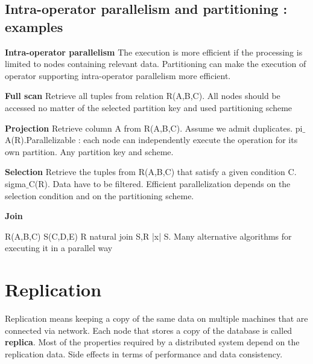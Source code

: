 \documentclass{article}
\begin{document}
\subsection{Intra-operator parallelism and partitioning : examples}

\textbf{Intra-operator parallelism }
The execution is more efficient if the processing is limited to nodes containing relevant data.
Partitioning can make the execution of operator supporting intra-operator parallelism more efficient. 

\vspace{3mm}
\textbf{Full scan}
\vspace{2mm}
Retrieve all tuples from relation R(A,B,C). All nodes should be accessed no matter of the selected partition key and used partitioning scheme


\vspace{3mm}
\textbf{Projection}
\vspace{2mm}
Retrieve column A from R(A,B,C). Assume we admit duplicates. pi$\_$A(R).Parallelizable : each node can independently execute the operation for its own partition. Any partition key and scheme.

\vspace{3mm}
\textbf{Selection}
\vspace{2mm}
Retrieve the tuples from R(A,B,C) that satisfy a given condition C. sigma$\_$C(R). Data have to be filtered. Efficient parallelization depends on the selection condition and on the partitioning scheme.


\vspace{3mm}
\textbf{Join}
\vspace{2mm}

R(A,B,C)  S(C,D,E)
R natural join S,R |x| S. Many alternative algorithms for executing it in a parallel way

\section{Replication}

Replication means keeping a copy of the same data on multiple machines that are connected via network.
Each node that stores a copy of the database is called \textbf{replica}.
Most of the properties required by a distributed system depend on the replication data. Side effects in terms of performance and data consistency.
\end{document}
